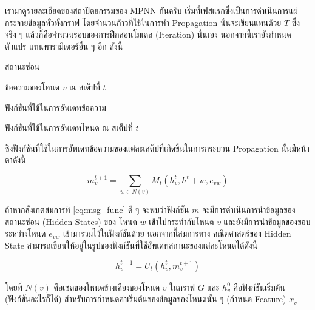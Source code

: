 เรามาดูรายละเอียดของสถาปัตยกรรมของ MPNN กันครับ เริ่มที่เฟสแรกซึ่งเป็นการดำเนินการแผ่กระจายข้อมูลทั่วทั้งกราฟ โดยจำนวนก้าวที่ใช้ในการทำ 
Propagation นั้นจะเขียนแทนด้วย $T$ ซึ่งจริง ๆ แล้วก็คือจำนวนรอบของการฝึกสอนโมเดล (Iteration) นั่นเอง นอกจากนี้เรายังกำหนดตัวแปร%
แทนพารามิเตอร์อื่น ๆ อีก ดังนี้

\begin{description}[font=$\bullet$,labelindent=2em,labelwidth=2cm,labelsep=0em]
    \item[\ $h$] สถานะซ่อน
    
    \item[\ $m^{t}_{v}$] ข้อความของโหนด $v$ ณ สเต็ปที่ $t$
    
    \item[\ $M$] ฟังก์ชันที่ใช้ในการอัพเดทข้อความ
    
    \item[\ $U_{t}$] ฟังก์ชันที่ใช้ในการอัพเดทโหนด ณ สเต็ปที่ $t$    
\end{description}

\noindent ซึ่งฟังก์ชันที่ใช้ในการอัพเดทข้อความของแต่ละเสต็ปที่เกิดขึ้นในการกระบวน Propagation นั้นมีหน้าตาดังนี้

\begin{equation}\label{eq:msg_func}
    m^{t+1}_{v} = \sum_{w \in N(v)} M_{t} (h^{t}_{v}, h^{t}+{w}, e_{vw})
\end{equation}

ถ้าหากสังเกตสมการที่ \ref{eq:msg_func} ดี ๆ จะพบว่าฟังก์ชัน $m$ จะมีการดำเนินการนำข้อมูลของสถานะซ่อน (Hidden States) ของ%
โหนด $w$ เข้าไปกระทำกับโหนด $v$ และยังมีการนำข้อมูลของขอบระหว่างโหนด $e_{vw}$ เข้ามารวมไว้ในฟังก์ชันด้วย นอกจากนี้สมการทาง%
คณิตศาสตร์ของ Hidden State สามารถเขียนให้อยู่ในรูปของฟังก์ชันที่ใช้อัพเดทสถานะของแต่ละโหนดได้ดังนี้ 

\begin{equation}\label{hidden_func}
    h^{t+1}_{v} = U_{t}(h^{t}_{v}, m^{t+1}_{v})
\end{equation}

\noindent โดยที่ $N(v)$ คือเซตของโหนดข้างเคียงของโหนด $v$ ในกราฟ $G$ และ $h^{0}_{v}$ คือฟังก์ชันเริ่มต้น (ฟังก์ชันอะไรก็ได้) 
สำหรับการกำหนดค่าเริ่มต้นของข้อมูลของโหนดนั้น ๆ (กำหนด Feature) $x_{v}$

\begin{center}
\end{center}


